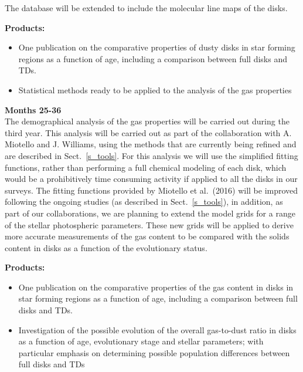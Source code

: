 \documentclass[10pt,fleqn,twoside]{article}
\begin{document}
The database will be extended to include the molecular line maps of the disks.
 
\smallskip
{\bf Products:} 
\begin{itemize}
\item One publication on the comparative properties of dusty disks in star forming regions as a function of age, including a comparison between full disks and TDs.
\item Statistical methods ready to be applied to the analysis of the gas properties
\end{itemize}

{\bf Months 25-36}\\

The demographical analysis of the gas properties will be carried out during the third year. This analysis will be carried out as part of the collaboration with A. Miotello and J. Williams, using the methods that are currently being refined and are described in Sect.~\ref{s_tools}. For this analysis we will use the simplified fitting functions, rather than performing a full chemical modeling of each disk, which would be a prohibitively time consuming activity if applied to all the disks in our surveys. The fitting functions provided by Miotello et al.~(2016) will be improved following the ongoing studies (as described in Sect.~\ref{s_tools}), in addition, as part of our collaborations, we are planning to extend the model grids for a range of the stellar photospheric parameters. These new grids will be applied to derive more accurate measurements of the gas content to be compared with the solids content in disks as a function of the evolutionary status. 

\smallskip
{\bf Products:} 
\begin{itemize}
\item One publication on the comparative properties of the gas content in disks in star forming regions as a function of age, including a comparison between full disks and TDs.
\item Investigation of the possible evolution of the overall gas-to-dust ratio in disks as a function of age, evolutionary stage and stellar parameters; with particular emphasis on determining possible population differences between full disks and TDs
\end{itemize}
\end{document}
